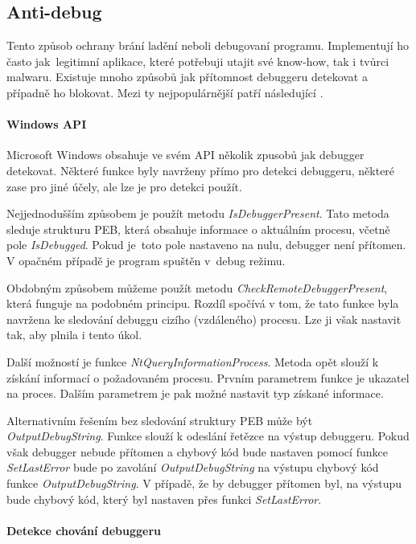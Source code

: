 \subsection{Anti-debug}
\label{anti_debug}

Tento způsob ochrany brání ladění neboli debugovaní programu. Implementují ho často jak~legitimní aplikace, které potřebuji utajit své know-how, tak i tvůrci malwaru. Existuje mnoho způsobů jak přítomnost debuggeru detekovat a případně ho blokovat. Mezi ty nejpopulárnější patří následující \cite{sikorski2012practical}.

\paragraph*{Windows API}

Microsoft Windows obsahuje ve svém API několik zpusobů jak debugger detekovat. Některé funkce byly navrženy přímo pro detekci debuggeru, některé zase pro jiné účely, ale lze je pro detekci použít.

Nejjednodušším způsobem je použít metodu \emph{IsDebuggerPresent}. Tato metoda sleduje strukturu PEB, která obsahuje informace o aktuálním procesu, včetně pole \emph{IsDebugged}. Pokud je~toto pole nastaveno na nulu, debugger není přítomen. V opačném případě je program spuštěn v~debug režimu.

Obdobným způsobem můžeme použít metodu \emph{CheckRemoteDebuggerPresent}, která funguje na podobném principu. Rozdíl spočívá v tom, že tato funkce byla navržena ke sledování debuggu cizího (vzdáleného) procesu. Lze ji však nastavit tak, aby plnila i tento úkol.

Další možností je funkce \emph{NtQueryInformationProcess}. Metoda opět slouží k získání informací o požadovaném procesu. Prvním parametrem funkce je ukazatel na proces. Dalším parametrem je pak možné nastavit typ získané informace. 

Alternativním řešením bez sledování struktury PEB může být \emph{OutputDebugString}. Funkce slouží k odeslání řetězce na výstup debuggeru. Pokud však debugger nebude přítomen a chybový kód bude nastaven pomocí funkce \emph{SetLastError} bude po zavolání \emph{OutputDebugString} na výstupu chybový kód funkce \emph{OutputDebugString}. V případě, že by debugger přítomen byl, na výstupu bude chybový kód, který byl nastaven přes funkci \emph{SetLastError}.

\paragraph*{Detekce chování debuggeru}

